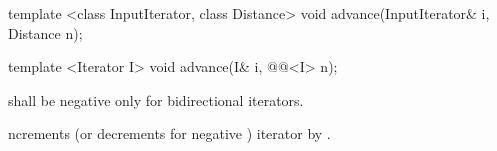 %
\begin{removedblock}
\begin{itemdecl}
template <class InputIterator, class Distance>
  void advance(InputIterator& i, Distance n);
\end{itemdecl}
\end{removedblock}
\begin{addedblock}
\begin{itemdecl}
template <Iterator I>
  void advance(I& i, @@<I> n);
\end{itemdecl}
\end{addedblock}

\begin{itemdescr}
\pnum
\requires
{}
shall be negative only for bidirectional iterators.

\pnum
\effects
{}ncrements (or decrements for negative
)
iterator
by
.
\end{itemdescr}

